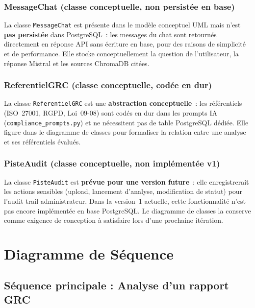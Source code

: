 \documentclass[a4paper,12pt,oneside]{report}
\begin{document}
	\subsubsection*{MessageChat \textnormal{\small(classe conceptuelle, non persist\'ee en base)}}
	
	La classe \texttt{MessageChat} est pr\'esente dans le mod\`ele conceptuel UML
	mais n'est \textbf{pas persist\'ee} dans PostgreSQL~: les messages du chat sont
	retourn\'es directement en r\'eponse API sans \'ecriture en base, pour des raisons
	de simplicit\'e et de performance. Elle stocke conceptuellement la question
	de l'utilisateur, la r\'eponse Mistral et les sources ChromaDB cit\'ees.
	
	\subsubsection*{ReferentielGRC \textnormal{\small(classe conceptuelle, cod\'ee en dur)}}
	
	La classe \texttt{ReferentielGRC} est une \textbf{abstraction conceptuelle}~:
	les r\'ef\'erentiels (ISO~27001, RGPD, Loi~09-08) sont cod\'es en dur dans les
	prompts IA (\texttt{compliance\_prompts.py}) et ne n\'ecessitent pas de table
	PostgreSQL d\'edi\'ee. Elle figure dans le diagramme de classes pour formaliser
	la relation entre une analyse et ses r\'ef\'erentiels \'evalu\'es.
	
	\subsubsection*{PisteAudit \textnormal{\small(classe conceptuelle, non impl\'ement\'ee v1)}}
	
	La classe \texttt{PisteAudit} est \textbf{pr\'evue pour une version future}~:
	elle enregistrerait les actions sensibles (upload, lancement d'analyse,
	modification de statut) pour l'audit trail administrateur. Dans la version~1
	actuelle, cette fonctionnalit\'e n'est pas encore impl\'ement\'ee en base PostgreSQL.
	Le diagramme de classes la conserve comme exigence de conception \`a satisfaire
	lors d'une prochaine it\'eration.
	
	\section{Diagramme de Séquence}
	
	\subsection{Séquence principale : Analyse d'un rapport GRC}
	
\end{document}
